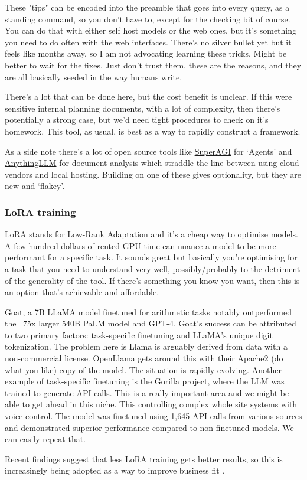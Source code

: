 These "tips" can be encoded into the preamble that goes into every query, as a standing command, so you don't have to, except for the checking bit of course.
You can do that with either self host models or the web ones, but it's something you need to do often with the web interfaces. There's no silver bullet yet but it feels like months away, so I am not advocating learning these tricks. Might be better to wait for the fixes. Just don't trust them, these are the reasons, and they are all basically seeded in the way humans write.

There's a lot that can be done here, but the cost benefit is unclear. If this were sensitive internal planning documents, with a lot of complexity, then there's potentially a strong case, but we'd need tight procedures to check on it's homework. This tool, as usual, is best as a way to rapidly construct a framework.\par 
As a side note there's a lot of open source tools like \href{https://github.com/TransformerOptimus/SuperAGI}{SuperAGI} for `Agents' and \href{https://github.com/Mintplex-Labs/anything-llm}{AnythingLLM} for document analysis which straddle the line between using cloud vendors and local hosting. Building on one of these gives optionality, but they are new and `flakey'.
\subsubsection{LoRA training}
\label{sec:LoRA}
LoRA stands for Low-Rank Adaptation and it's a cheap way to optimise models. A few hundred dollars of rented GPU time can nuance a model to be more performant for a specific task. It sounds great but basically you're optimising for a task that you need to understand very well, possibly/probably to the detriment of the generality of the tool. If there's something you know you want, then this is an option that's achievable and affordable.\par
Goat, a 7B LLaMA model finetuned for arithmetic tasks notably outperformed the ~75x larger 540B PaLM model and GPT-4. Goat's success can be attributed to two primary factors: task-specific finetuning and LLaMA's unique digit tokenization. The problem here is Llama is arguably derived from data with a non-commercial license. OpenLlama gets around this with their Apache2 (do what you like) copy of the model. The situation is rapidly evolving. Another example of task-specific finetuning is the Gorilla project, where the LLM was trained to generate API calls. This is a really important area and we might be able to get ahead in this niche. This controlling complex whole site systems with voice control. The model was finetuned using 1,645 API calls from various sources and demonstrated superior performance compared to non-finetuned models. We can easily repeat that.\par
Recent findings suggest that less LoRA training gets better results, so this is increasingly being adopted as a way to improve business fit \cite{xue2023repeat}.
